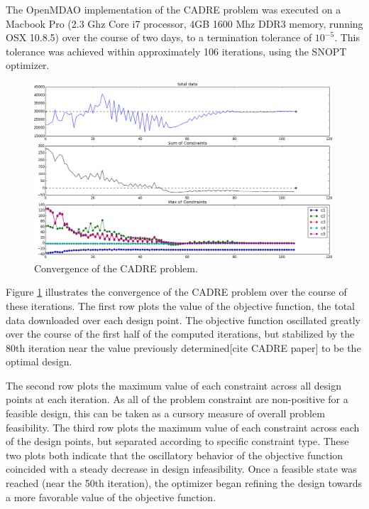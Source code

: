 \documentclass[]{aiaa-tc} %
\begin{document}
The OpenMDAO implementation of the CADRE problem was executed on a Macbook Pro (2.3 Ghz Core i7 processor, 4GB 1600 Mhz DDR3 memory, running OSX 10.8.5)
over the course of two days, to a termination tolerance of $10^{-5}$. This tolerance
was achieved within approximately 106 iterations, using the SNOPT\cite{gill2005snopt}
optimizer.

\begin{figure}
\centering
\includegraphics[width=0.99\textwidth]{images/opt.png}
\caption[width=0.22\textwidth]{Convergence of the CADRE problem.}
\label{convergence}
\end{figure}


Figure \ref{convergence} illustrates the convergence of the CADRE problem over the course of
these iterations. The first row plots the
value of the objective function, the total data downloaded over each design point. The objective
function oscillated greatly over the course of the first half of the computed iterations, but
stabilized by the 80th iteration near the value previously determined[cite CADRE paper]
to be the optimal design.

The second row plots the maximum value of each constraint across all design points at
each iteration. As all of the problem constraint are non-positive for a feasible design,
this can be taken as a cursory measure of overall problem feasibility.
The third row plots the maximum value of each constraint across each of the design points,
but separated according to specific constraint type. These two plots both indicate that the
oscillatory behavior of the objective function coincided with a steady decrease in design
infeasibility. Once a feasible state was reached (near the 50th iteration), the optimizer
began refining the design towards a more favorable value of the objective function.
\end{document}
